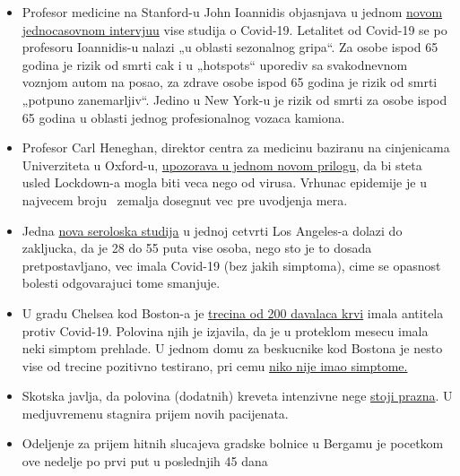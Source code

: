 \begin{itemize}
\tightlist
\item
  Profesor medicine na Stanford-u John Ioannidis objasnjava u jednom
  \href{https://www.youtube.com/watch?v=cwPqmLoZA4s}{novom jednocasovnom
  intervjuu} vise studija o Covid-19. Letalitet od Covid-19 se po
  profesoru Ioannidis-u nalazi „u oblasti sezonalnog gripa``. Za osobe
  ispod 65 godina je rizik od smrti cak i u „hotspots`` uporediv sa
  svakodnevnom voznjom autom na posao, za zdrave osobe ispod 65 godina
  je rizik od smrti „potpuno zanemarljiv``. Jedino u New York-u je rizik
  od smrti za osobe ispod 65 godina u oblasti jednog profesionalnog
  vozaca kamiona.
\item
  Profesor Carl Heneghan, direktor centra za medicinu baziranu na
  cinjenicama Univerziteta u Oxford-u,
  \href{https://news.yahoo.com/lockdown-damage-outweighs-coronavirus-warning-121940675.html}{upozorava
  u jednom novom prilogu}, da bi steta usled Lockdown-a mogla biti veca
  nego od virusa. Vrhunac epidemije je u najvecem broju ~zemalja
  dosegnut vec pre uvodjenja mera.
\item
  Jedna
  \href{http://publichealth.lacounty.gov/phcommon/public/media/mediapubhpdetail.cfm?prid=2328}{nova
  seroloska studija} u jednoj cetvrti Los Angeles-a dolazi do zakljucka,
  da je 28 do 55 puta vise osoba, nego sto je to dosada pretpostavljano,
  vec imala Covid-19 (bez jakih simptoma), cime se opasnost bolesti
  odgovarajuci tome smanjuje.
\item
  U gradu Chelsea kod Boston-a je
  \href{https://archive.is/20200418222442/https:/www.bostonglobe.com/2020/04/17/business/nearly-third-200-blood-samples-taken-chelsea-show-exposure-coronavirus/}{trecina
  od 200 davalaca krvi} imala antitela protiv Covid-19. Polovina njih je
  izjavila, da je u proteklom mesecu imala neki simptom prehlade. U
  jednom domu za beskucnike kod Bostona je nesto vise od trecine
  pozitivno testirano, pri cemu
  \href{https://www.wsbtv.com/news/trending/coronavirus-cdc-reviewing-stunning-universal-testing-results-boston-homeless-shelter/ZADQ45HCAZEVJAZA3OTCUR7M6M/}{niko
  nije imao simptome.}
\item
  Skotska javlja, da polovina (dodatnih) kreveta intenzivne nege
  \href{https://www.heraldscotland.com/news/18377095.coronavirus-scotland-half-icu-beds-empty/}{stoji
  prazna}. U medjuvremenu stagnira prijem novih pacijenata.
\item
  Odeljenje za prijem hitnih slucajeva gradske bolnice u Bergamu je
  pocetkom ove nedelje po prvi put u poslednjih 45 dana

\end{itemize}
